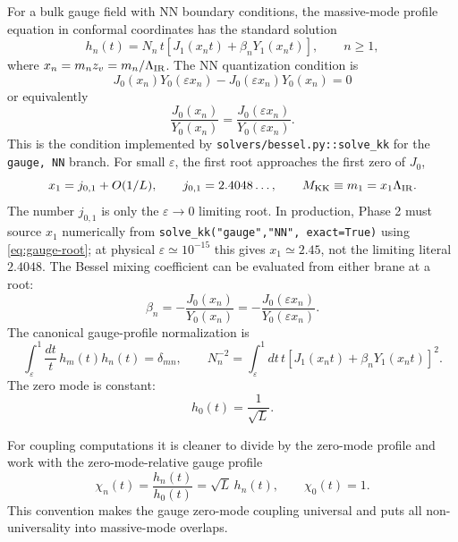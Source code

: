 \documentclass[11pt]{article}
\begin{document}
For a bulk gauge field with NN boundary conditions, the massive-mode profile
equation in conformal coordinates has the standard solution
\begin{equation}
  h_n(t) = N_n\,t\left[J_1(x_n t)+\beta_n Y_1(x_n t)\right],
  \qquad n\ge 1,
  \label{eq:gauge-profile}
\end{equation}
where \(x_n=m_n z_v=m_n/\Lambda_{\rm IR}\).  The NN quantization condition is
\begin{equation}
  \boxed{
  J_0(x_n)Y_0(\varepsilon x_n)
  -J_0(\varepsilon x_n)Y_0(x_n)=0}
  \label{eq:gauge-root}
\end{equation}
or equivalently
\begin{equation}
  \frac{J_0(x_n)}{Y_0(x_n)}
  =
  \frac{J_0(\varepsilon x_n)}{Y_0(\varepsilon x_n)}.
\end{equation}
This is the condition implemented by \texttt{solvers/bessel.py::solve\_kk}
for the \texttt{gauge, NN} branch.  For small \(\varepsilon\), the first root
approaches the first zero of \(J_0\),
\begin{equation}
  x_1 = j_{0,1}+O(1/L), \qquad j_{0,1}=2.4048\ldots,\qquad
  M_{\rm KK}\equiv m_1=x_1\Lambda_{\rm IR}.
  \label{eq:first-root}
\end{equation}
The number \(j_{0,1}\) is only the \(\varepsilon\to0\) limiting root.  In
production, Phase 2 must source \(x_1\) numerically from
\texttt{solve\_kk("gauge","NN", exact=True)} using
\eqref{eq:gauge-root}; at physical \(\varepsilon\simeq10^{-15}\) this gives
\(x_1\simeq2.45\), not the limiting literal \(2.4048\).
The Bessel mixing coefficient can be evaluated from either brane at a root:
\begin{equation}
  \beta_n =
  -\frac{J_0(x_n)}{Y_0(x_n)}
  =
  -\frac{J_0(\varepsilon x_n)}{Y_0(\varepsilon x_n)}.
\end{equation}
The canonical gauge-profile normalization is
\begin{equation}
  \boxed{
  \int_\varepsilon^1 \frac{dt}{t}\,h_m(t)h_n(t)=\delta_{mn}},
  \qquad
  N_n^{-2} =
  \int_\varepsilon^1 dt\,t
  \left[J_1(x_n t)+\beta_n Y_1(x_n t)\right]^2 .
  \label{eq:gauge-normalization}
\end{equation}
The zero mode is constant:
\begin{equation}
  h_0(t)=\frac{1}{\sqrt L}.
\end{equation}

For coupling computations it is cleaner to divide by the zero-mode profile and
work with the zero-mode-relative gauge profile
\begin{equation}
  \boxed{\chi_n(t)=\frac{h_n(t)}{h_0(t)}=\sqrt L\,h_n(t)},
  \qquad
  \chi_0(t)=1.
  \label{eq:relative-profile}
\end{equation}
This convention makes the gauge zero-mode coupling universal and puts all
non-universality into massive-mode overlaps.
\end{document}
